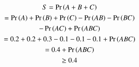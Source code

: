 \begin{multline}
    S = \Pr\left(A + B + C\right) \\
    = \Pr\left(A\right) + \Pr\left(B\right) + \Pr\left(C\right) - \Pr\left(AB\right) -\Pr\left(BC\right)\\  -\Pr\left(AC\right)+\Pr\left(ABC\right) \\
    = 0.2 + 0.2 + 0.3 - 0.1 -0.1 -0.1 + \Pr\left(ABC\right)  \\
    = 0.4 + \Pr\left(ABC\right) \\
    \geq 0.4 
    \end{multline}